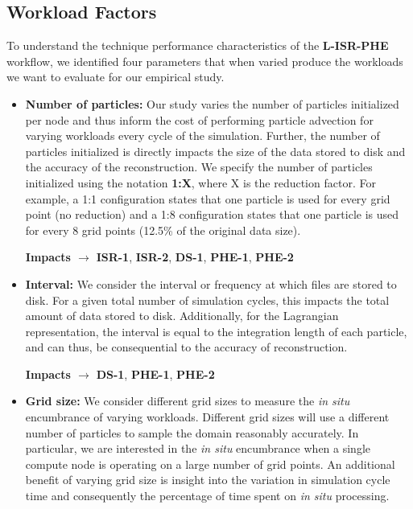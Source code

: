 \subsection{Workload Factors}
\label{sec:workloads}
To understand the technique performance characteristics of the \textbf{L-ISR-PHE} workflow, we identified four parameters that when varied produce the workloads we want to evaluate for our empirical study. 
\begin{itemize}
\item \textbf{Number of particles:} Our study varies the number of particles initialized per node and thus inform the cost of performing particle advection for varying workloads every cycle of the simulation. Further, the number of particles initialized is directly impacts the size of the data stored to disk and the accuracy of the reconstruction.
%
We specify the number of particles initialized using the notation \textbf{1:X}, where X is the reduction factor.
%
For example, a 1:1 configuration states that one particle is used for every grid point (no reduction) and a 1:8 configuration states that one particle is used for every 8 grid points (12.5\% of the original data size).
%

\textbf{Impacts $\rightarrow$} \textbf{ISR-1}, \textbf{ISR-2}, \textbf{DS-1}, \textbf{PHE-1}, \textbf{PHE-2}

\item \textbf{Interval:} We consider the interval or frequency at which files are stored to disk.
%
For a given total number of simulation cycles, this impacts the total amount of data stored to disk. 
%
Additionally, for the Lagrangian representation, the interval is equal to the integration length of each particle, and can thus, be consequential to the accuracy of reconstruction.
%
%

\textbf{Impacts $\rightarrow$} \textbf{DS-1}, \textbf{PHE-1}, \textbf{PHE-2}

\item \textbf{Grid size:} We consider different grid sizes to measure the \textit{in situ} encumbrance of varying workloads.
%
Different grid sizes will use a different number of particles to sample the domain reasonably accurately.
%
In particular, we are interested in the \textit{in situ} encumbrance when a single compute node is operating on a large number of grid points.
%
An additional benefit of varying grid size is insight into the variation in simulation cycle time and consequently the percentage of time spent on \textit{in situ} processing.


\end{itemize}
